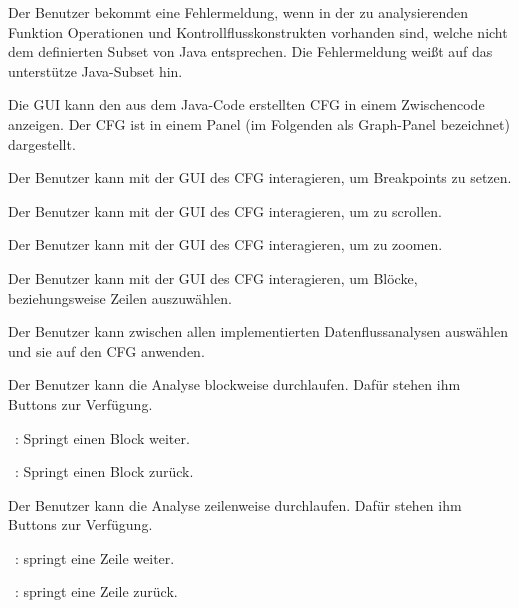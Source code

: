 Der Benutzer bekommt eine Fehlermeldung, wenn in der zu analysierenden Funktion Operationen und Kontrollflusskonstrukten vorhanden sind, welche nicht dem definierten Subset von Java entsprechen. Die Fehlermeldung weißt auf das unterstütze Java-Subset hin.

Die GUI kann den aus dem Java-Code erstellten CFG in einem Zwischencode anzeigen. Der CFG ist in einem Panel (im Folgenden als Graph-Panel bezeichnet) dargestellt.

Der Benutzer kann mit der GUI des CFG interagieren, um Breakpoints zu setzen.

Der Benutzer kann mit der GUI des CFG interagieren, um zu scrollen.

Der Benutzer kann mit der GUI des CFG interagieren, um zu zoomen.

Der Benutzer kann mit der GUI des CFG interagieren, um Blöcke, beziehungsweise Zeilen auszuwählen.

Der Benutzer kann zwischen allen implementierten Datenflussanalysen auswählen und sie auf den CFG anwenden.

Der Benutzer kann die Analyse blockweise durchlaufen. Dafür stehen ihm Buttons zur Verfügung.\par
\faFastForward\ : Springt einen Block weiter.\par
\faFastBackward\ : Springt einen Block zurück.

Der Benutzer kann die Analyse zeilenweise durchlaufen. Dafür stehen ihm Buttons zur Verfügung.\par
\faForward\ : springt eine Zeile weiter.\par
\faBackward\ : springt eine Zeile zurück.

